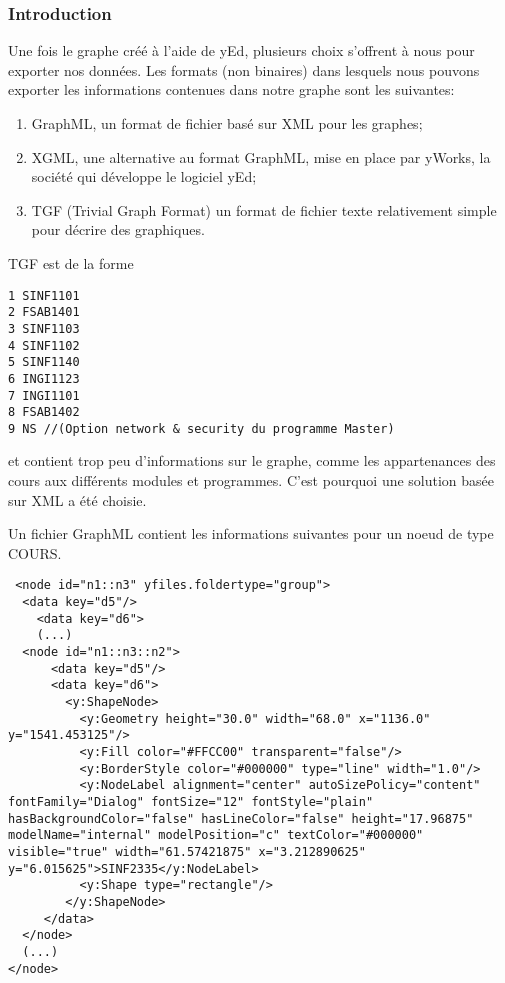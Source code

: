 \subsubsection{Introduction}
\label{graph_format_justification}
Une fois le graphe créé à l'aide de yEd, plusieurs choix s'offrent à nous pour exporter nos données. Les formats (non binaires) dans lesquels nous pouvons exporter les informations contenues dans notre graphe sont les suivantes:
\begin{enumerate}
\item GraphML, un format de fichier basé sur XML pour les graphes;
\item XGML, une alternative au format GraphML, mise en place par yWorks, la société qui développe le logiciel yEd;
\item TGF (Trivial Graph Format) un format de fichier texte relativement simple pour décrire des graphiques.
\end{enumerate}

TGF est de la forme

\begin{lstlisting}
1 SINF1101
2 FSAB1401
3 SINF1103
4 SINF1102
5 SINF1140
6 INGI1123
7 INGI1101
8 FSAB1402
9 NS //(Option network & security du programme Master)
\end{lstlisting}

et contient trop peu d'informations sur le graphe, comme les appartenances des cours aux différents modules et programmes. C'est pourquoi une solution basée sur XML a été choisie.

Un fichier GraphML contient les informations suivantes pour un noeud de type COURS.

\begin{lstlisting}
 <node id="n1::n3" yfiles.foldertype="group">
  <data key="d5"/>
    <data key="d6">
    (...)
  <node id="n1::n3::n2">
      <data key="d5"/>
      <data key="d6">
        <y:ShapeNode>
          <y:Geometry height="30.0" width="68.0" x="1136.0" y="1541.453125"/>
          <y:Fill color="#FFCC00" transparent="false"/>
          <y:BorderStyle color="#000000" type="line" width="1.0"/>
          <y:NodeLabel alignment="center" autoSizePolicy="content" fontFamily="Dialog" fontSize="12" fontStyle="plain" hasBackgroundColor="false" hasLineColor="false" height="17.96875" modelName="internal" modelPosition="c" textColor="#000000" visible="true" width="61.57421875" x="3.212890625" y="6.015625">SINF2335</y:NodeLabel>
          <y:Shape type="rectangle"/>
        </y:ShapeNode>
     </data>
  </node>
  (...)
</node>
\end{lstlisting}

